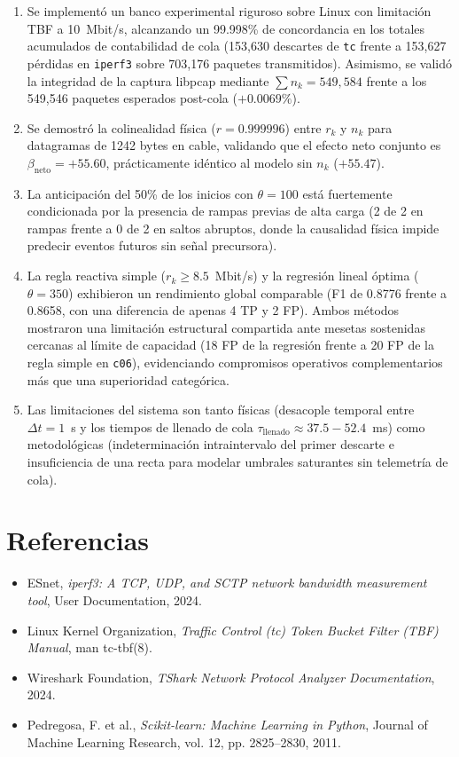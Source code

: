 \documentclass[11pt,a4paper]{article}
\begin{document}
\begin{enumerate}
    \item Se implementó un banco experimental riguroso sobre Linux con limitación TBF a 10~Mbit/s, alcanzando un 99.998\% de concordancia en los totales acumulados de contabilidad de cola (153,630 descartes de \texttt{tc} frente a 153,627 pérdidas en \texttt{iperf3} sobre 703,176 paquetes transmitidos). Asimismo, se validó la integridad de la captura libpcap mediante $\sum n_k = 549,584$ frente a los 549,546 paquetes esperados post-cola ($+0.0069\%$).
    \item Se demostró la colinealidad física ($r = 0.999996$) entre $r_k$ y $n_k$ para datagramas de 1242 bytes en cable, validando que el efecto neto conjunto es $\beta_{\text{neto}} = +55.60$, prácticamente idéntico al modelo sin $n_k$ ($+55.47$).
    \item La anticipación del 50\% de los inicios con $\theta = 100$ está fuertemente condicionada por la presencia de rampas previas de alta carga (2 de 2 en rampas frente a 0 de 2 en saltos abruptos, donde la causalidad física impide predecir eventos futuros sin señal precursora).
    \item La regla reactiva simple ($r_k \ge 8.5$~Mbit/s) y la regresión lineal óptima ($\theta = 350$) exhibieron un rendimiento global comparable (F1 de 0.8776 frente a 0.8658, con una diferencia de apenas 4 TP y 2 FP). Ambos métodos mostraron una limitación estructural compartida ante mesetas sostenidas cercanas al límite de capacidad (18 FP de la regresión frente a 20 FP de la regla simple en \texttt{c06}), evidenciando compromisos operativos complementarios más que una superioridad categórica.
    \item Las limitaciones del sistema son tanto físicas (desacople temporal entre $\Delta t = 1$~s y los tiempos de llenado de cola $\tau_{\text{llenado}} \approx 37.5 - 52.4$~ms) como metodológicas (indeterminación intraintervalo del primer descarte e insuficiencia de una recta para modelar umbrales saturantes sin telemetría de cola).
\end{enumerate}

\section*{Referencias}
\begin{itemize}
    \item ESnet, \textit{iperf3: A TCP, UDP, and SCTP network bandwidth measurement tool}, User Documentation, 2024.
    \item Linux Kernel Organization, \textit{Traffic Control (tc) Token Bucket Filter (TBF) Manual}, man tc-tbf(8).
    \item Wireshark Foundation, \textit{TShark Network Protocol Analyzer Documentation}, 2024.
    \item Pedregosa, F. et al., \textit{Scikit-learn: Machine Learning in Python}, Journal of Machine Learning Research, vol. 12, pp. 2825--2830, 2011.
\end{itemize}
\end{document}
